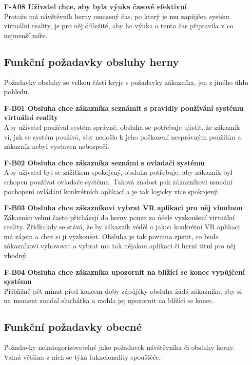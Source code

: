 \textbf{F-A08 Uživatel chce, aby byla výuka časově efektivní}\\
Protože má návštěvník herny omezený čas, po který je mu zapůjčen systém
virtuální reality, je pro něj důležité, aby ho výuka o tento čas
připravila v co nejmenší míře.

\subsection{Funkční požadavky obsluhy
herny}\label{funkux10dnuxed-poux17eadavky-obsluhy-herny}

Požadavky obsluhy se velkou částí kryje s požadavky zákazníka, jen z
jiného úhlu pohledu.

\textbf{F-B01 Obsluha chce zákazníka seznámit s pravidly používání
systému virtuální reality}\\
Aby uživatel používal systém správně, obsluha se potřebuje ujistit, že
zákazník ví, jak se systém používá, aby nedošlo k jeho poškození
nesprávným použitím a zákazník nebyl vystaven nebezpečí.

\textbf{F-B02 Obsluha chce zákazníka seznámi s ovladači systému}\\
Aby uživatel byl se zážitkem spokojený, obsluha potřebuje, aby zákazník
byl schopen používat ovladače systému. Taková znalost pak zákazníkovi
usnadní pochopení ovládání konkrétních aplikací a je tak logicky více
spokojený.

\textbf{F-B03 Obsluha chce zákazníkovi vybrat VR aplikaci pro něj
vhodnou}\\
Zákazníci velmi často přicházejí do herny pouze za účele vyzkoušení
virtuální reality. Zřídkakdy se stává, že by zákazník věděl o jakou
konkrétní VR aplikaci má zájem a chce si ji vyzkoušet. Obsluha je tak
povinna zjistit, co bude zákazníkovi vyhovovat a vybrat mu tak nějakou
aplikaci či herní titul pro něj vhodný.

\textbf{F-B04 Obsluha chce zákazníka upozornit na blížící se konec
vypůjčení systému}\\
Přibližně pět minut před koncem doby zápůjčky obsluha žádá zákazníka,
aby si na moment sundal sluchátka a mohla jej upozornit na blížící se
konec.

\subsection{Funkční požadavky
obecné}\label{funkux10dnuxed-poux17eadavky-obecnuxe9}

Požadavky nekategorizovatelné jako požadavek návštěvníka či obsluhy
herny. Valná většina z nich se týká fukncionality spouštěče.

